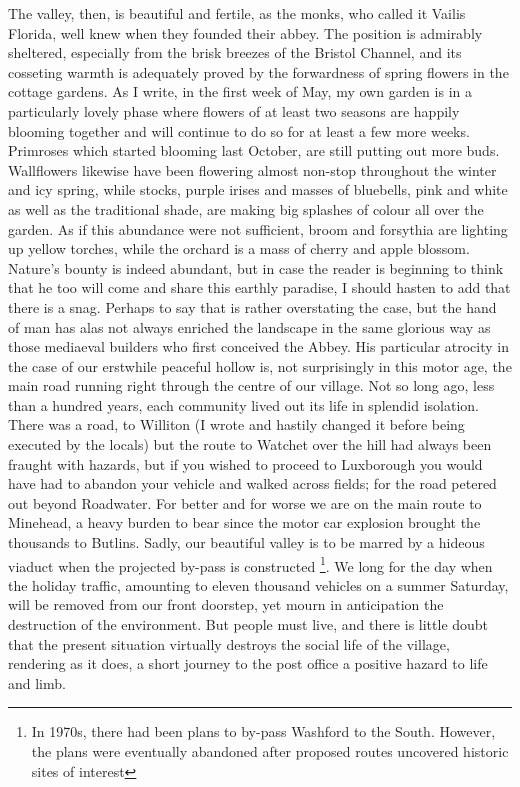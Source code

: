 The valley, then, is beautiful and fertile, as the monks, who called it Vailis Florida, well knew when they founded their abbey. The position is admirably sheltered, especially from the brisk breezes of the Bristol Channel, and its cosseting warmth is adequately proved by the forwardness of spring flowers in the cottage gardens. As I write, in the first week of May, my own garden is in a particularly lovely phase where flowers of at least two seasons are happily blooming together and will continue to do so for at least a few more weeks. Primroses which started blooming last October, are still putting out more buds. Wallflowers likewise have been flowering almost non-stop throughout the winter and icy spring, while stocks, purple irises and masses of bluebells, pink and white as well as the traditional shade, are making big splashes of colour all over the garden. As if this abundance were not sufficient, broom and forsythia are lighting up yellow torches, while the orchard is a mass of cherry and apple blossom. Nature’s bounty is indeed abundant, but in case the reader is beginning to think that he too will come and share this earthly paradise, I should hasten to add that there is a snag. Perhaps to say that  is rather overstating the case, but the hand of man has alas not always enriched the landscape in the same glorious way as those mediaeval builders who first conceived the Abbey. His particular atrocity in the case of our erstwhile peaceful hollow is, not surprisingly in this motor age, the main road running right through the centre of our village. Not so long ago, less than a hundred years, each community lived out its life in splendid isolation. There was a road, to Williton (I wrote  and hastily changed it before being executed by the locals) but the route to Watchet over the hill had always been fraught with hazards, but if you wished to proceed to Luxborough you would have had to abandon your vehicle and walked across fields; for the road petered out beyond Roadwater. For better and for worse we are on the main route to Minehead, a heavy burden to bear since the motor car explosion brought the thousands to Butlins. Sadly, our beautiful valley is to be marred by a hideous viaduct when the projected by-pass is constructed \footnote{In 1970s, there had been plans to by-pass Washford to the South. However, the plans were eventually abandoned after proposed routes uncovered historic sites of interest}. We long for the day when the holiday traffic, amounting to eleven thousand vehicles on a summer Saturday, will be removed from our front doorstep, yet mourn in anticipation the destruction of the environment. But people must live, and there is little doubt that the present situation virtually destroys the social life of the village, rendering as it does, a short journey to the post office a positive hazard to life and limb.

